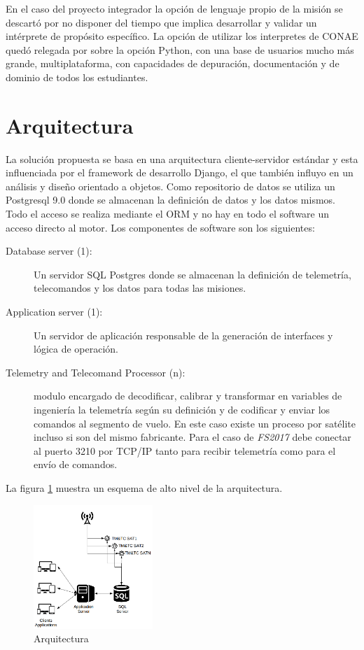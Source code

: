 \documentclass[twoside,twocolumn]{article}
\begin{document}
En el caso del proyecto integrador la opción de lenguaje propio de la misión se descartó por no disponer del tiempo que implica desarrollar y validar un intérprete de propósito específico. La opción de utilizar los interpretes de CONAE quedó relegada por sobre la opción Python, con una base de usuarios mucho más grande, multiplataforma, con capacidades de depuración, documentación y de dominio de todos los estudiantes. 




\section{Arquitectura}
La solución propuesta se basa en una arquitectura cliente-servidor estándar y esta influenciada por el framework de desarrollo Django, el que también influyo en un análisis y diseño orientado a objetos. Como repositorio de datos se utiliza un Postgresql 9.0 donde se almacenan la definición de datos y los datos mismos. Todo el acceso se realiza mediante el ORM y no hay en todo el software un acceso directo al motor. Los componentes de software son los siguientes:

\begin{description}
 \item [Database server (1): ] Un servidor SQL Postgres donde se almacenan la definición de telemetría, telecomandos y los datos para todas las misiones.  
 \item [Application server (1): ] Un servidor de aplicación responsable de la generación de interfaces y lógica de operación.
 \item [Telemetry and Telecomand Processor (n): ] modulo encargado de decodificar, calibrar y transformar en variables de ingeniería la telemetría según su definición y de codificar y enviar los comandos al segmento de vuelo. En este caso existe un proceso por satélite incluso si son del mismo fabricante. Para el caso de \textit{FS2017} debe conectar al puerto 3210 por TCP/IP tanto para recibir telemetría como para el envío de comandos.
\end{description}

La figura \ref{fig:Arq01} muestra un esquema de alto nivel de la arquitectura.

\begin{figure}[]
  \caption{Arquitectura}
  \label{fig:Arq01}
  \centering
  \includegraphics[width=0.4\textwidth]{Imagenes/Arq01.png}
\end{figure}
\end{document}
